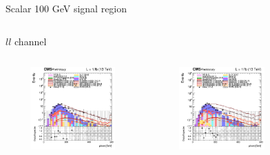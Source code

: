 \documentclass[8pt]{beamer}
\begin{document}
\begin{frame}{Scalar 100 GeV signal region}
\begin{columns}
\begin{column}{1.09\textwidth}
\begin{block}{\centering $ll$ channel}\end{block}
\end{column}
\end{columns} \vspace{-5pt}
\begin{columns}
		\begin{column}{0.33\textwidth}
			\begin{center}
			\vspace{-8pt}
			\begin{block}{}\end{block}\vspace{10pt}
     			\includegraphics[width=1.0\textwidth, height=90pt]{figs/2016/log_cratio_topCR_ll_DNN_signal0_scalar100_METcorrected_pt.png}
    		\end{center}		
		\end{column} 
		\begin{column}{0.33\textwidth}
			\begin{center}
			\vspace{-8pt}
			\begin{block}{}\end{block}\vspace{10pt}
     			\includegraphics[width=1.0\textwidth, height=90pt]{figs/2017/log_cratio_topCR_ll_DNN_signal0_scalar100_METcorrected_pt.png}
    		\end{center}		
		\end{column} 
		\begin{column}{0.33\textwidth}
			\begin{center}

\end{center}
\end{column}
\end{columns}
\end{frame}
\end{document}
